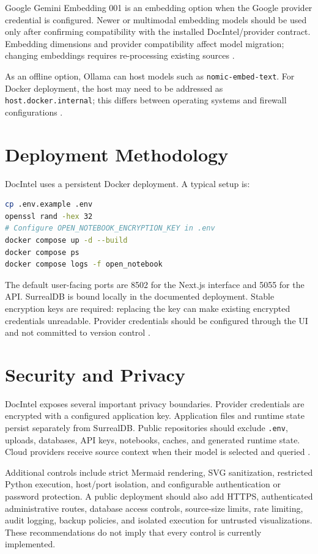 \documentclass[conference]{IEEEtran}
\begin{document}
Google Gemini Embedding 001 is an embedding option when the Google provider credential is configured. Newer or multimodal embedding models should be used only after confirming compatibility with the installed DocIntel/provider contract. Embedding dimensions and provider compatibility affect model migration; changing embeddings requires re-processing existing sources \cite{googleembed}.

As an offline option, Ollama can host models such as \texttt{nomic-embed-text}. For Docker deployment, the host may need to be addressed as \texttt{host.docker.internal}; this differs between operating systems and firewall configurations \cite{ollama}.

\section{Deployment Methodology}
DocIntel uses a persistent Docker deployment. A typical setup is:
\begin{lstlisting}[language=bash,caption={Deployment commands},float=tb]
cp .env.example .env
openssl rand -hex 32
# Configure OPEN_NOTEBOOK_ENCRYPTION_KEY in .env
docker compose up -d --build
docker compose ps
docker compose logs -f open_notebook
\end{lstlisting}

The default user-facing ports are 8502 for the Next.js interface and 5055 for the API. SurrealDB is bound locally in the documented deployment. Stable encryption keys are required: replacing the key can make existing encrypted credentials unreadable. Provider credentials should be configured through the UI and not committed to version control \cite{docintel}.

\section{Security and Privacy}
DocIntel exposes several important privacy boundaries. Provider credentials are encrypted with a configured application key. Application files and runtime state persist separately from SurrealDB. Public repositories should exclude \texttt{.env}, uploads, databases, API keys, notebooks, caches, and generated runtime state. Cloud providers receive source context when their model is selected and queried \cite{docintel}.

Additional controls include strict Mermaid rendering, SVG sanitization, restricted Python execution, host/port isolation, and configurable authentication or password protection. A public deployment should also add HTTPS, authenticated administrative routes, database access controls, source-size limits, rate limiting, audit logging, backup policies, and isolated execution for untrusted visualizations. These recommendations do not imply that every control is currently implemented.
\end{document}
